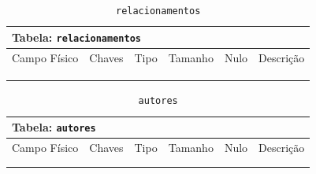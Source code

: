 \documentclass[12pt,a4paper]{article}
\begin{document}
\begin{center}
\begin{table}[h!]
	\caption{\texttt{relacionamentos}}
	\label{tabela:relacionamentos}
	\begin{tabular}{|p{2.5cm}|p{1cm}|p{1.25cm}|p{1.75cm}|p{1.25cm}|p{5cm}|}\hline	
		\multicolumn{6}{|p{16cm}|}{\cellcolor{cinzaClaro}  \centering Tabela: \texttt{relacionamentos}} \\ \hline %
		{\small Campo Físico}   & {\small Chaves} & {\small Tipo} & {\small Tamanho} & {\small Nulo} & {\small Descrição}\\\hline %
		
		{\tiny } & {\tiny } & {\tiny } & {\tiny } & {\tiny } &{\tiny }\\\hline
		{\tiny } & {\tiny } & {\tiny } & {\tiny } & {\tiny } &{\tiny }\\\hline
		{\tiny } & {\tiny } & {\tiny } & {\tiny } & {\tiny } &{\tiny }\\\hline
		
			
	\end{tabular}
\end{table}	
\end{center}

\begin{center}
\begin{table}[h!]
	\caption{\texttt{autores}}
	\label{tabela:autores}
	\begin{tabular}{|p{2.5cm}|p{1cm}|p{1.25cm}|p{1.75cm}|p{1.25cm}|p{5cm}|}\hline	
		\multicolumn{6}{|p{16cm}|}{\cellcolor{cinzaClaro}  \centering Tabela: \texttt{autores}} \\ \hline %
		{\small Campo Físico}   & {\small Chaves} & {\small Tipo} & {\small Tamanho} & {\small Nulo} & {\small Descrição}\\\hline %
		
		{\tiny } & {\tiny } & {\tiny } & {\tiny } & {\tiny } &{\tiny }\\\hline
		{\tiny } & {\tiny } & {\tiny } & {\tiny } & {\tiny } &{\tiny }\\\hline
			
	\end{tabular}
\end{table}	
\end{center}
\end{document}
